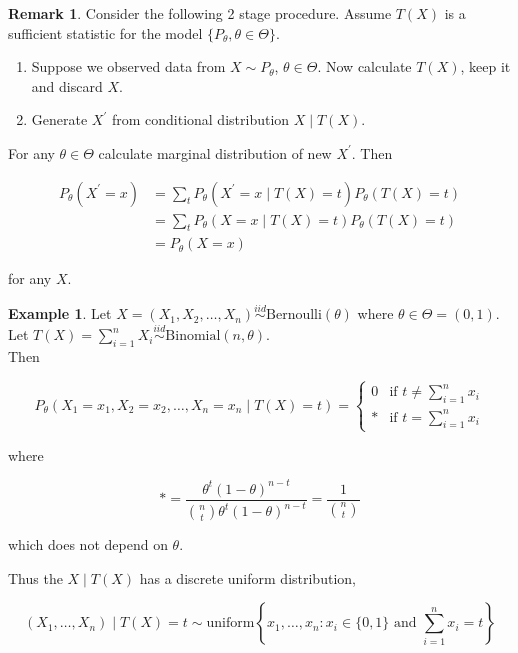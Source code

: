 \documentclass[12pt]{article}
\theoremstyle{definition}
\newtheorem*{example}{Example}
\newtheorem*{remark}{Remark}
\begin{document}
\begin{remark}
Consider the following 2 stage procedure. Assume $T(X)$ is a sufficient
statistic for the model $\{P_{\theta}, \theta \in \Theta \}$.
 
\begin{enumerate}[label = (\arabic*)]
\item Suppose we observed data from $X \sim P_{\theta}$, 
$\theta \in \Theta$. Now calculate $T(X)$, keep it and discard $X$.

\item Generate $X^{\prime}$ from conditional distribution $X \mid T(X)$.
\end{enumerate}

For any $\theta \in \Theta$ calculate marginal distribution of new
$X^{\prime}$. Then

\begin{align*}
P_{\theta}(X^{\prime} = x) &= \sum_{t} P_{\theta}(X^{\prime} = x \mid T(X) = t)P_{\theta}(T(X) = t) \\
&= \sum_{t} P_{\theta}(X = x \mid T(X) = t)P_{\theta}(T(X) = t) \\
&= P_{\theta}(X = x)
\end{align*}

for any $X$.
\end{remark}

\begin{example}
Let $X = (X_1, X_2, \ldots, X_n) \overset{iid}{\sim} \text{Bernoulli}(\theta)$ where
$\theta \in \Theta = (0, 1)$. Let 
$T(X) = \sum_{i = 1}^n X_i \overset{iid}{\sim} \text{Binomial}(n, \theta)$. \\

Then

\begin{equation*}
P_{\theta}(X_1 = x_1, X_2 = x_2, \ldots, X_n = x_n \mid T(X) = t) =
\begin{cases}
0 & \text{if } t \neq \sum_{i = 1}^n x_i \\
* & \text{if } t = \sum_{i = 1}^n x_i
\end{cases}
\end{equation*}

where 

\begin{equation*}
* = \frac{\theta^t (1 - \theta)^{n - t}}{\binom{n}{t} \theta^t (1 - \theta)^{n - t}} =
\frac{1}{\binom{n}{t}}
\end{equation*}

which does not depend on $\theta$.

Thus the $X \mid T(X)$ has a discrete uniform distribution,

\begin{equation*}
(X_1, \ldots, X_n) \mid T(X) = t \sim \text{uniform} \left\{ x_1, \ldots, x_n :
x_i \in \{0, 1\} \text{ and } \sum_{i = 1}^n x_i = t \right\}
\end{equation*}
\end{example}
\end{document}
